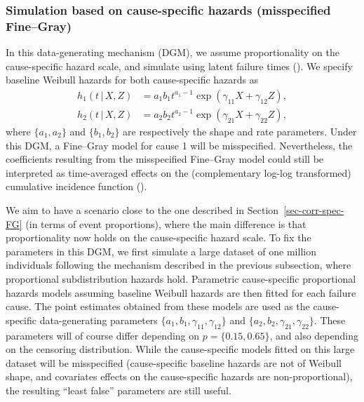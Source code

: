 \documentclass[
  letterpaper,
  paper=240mm:170mm,
  twoside=true,
  open=right,
  fontsize=10pt,
  pagesize=false,
  BCOR=15mm,
  DIV=14,
  headinclude=true,
  footinclude=false,
  headsepline=on]{scrbook}
\newcommand{\given}{\,|\,}
\begin{document}
\subsubsection{Simulation based on cause-specific hazards (misspecified
Fine--Gray)}\label{simulation-based-on-cause-specific-hazards-misspecified-finegray}

In this data-generating mechanism (DGM), we assume proportionality on
the cause-specific hazard scale, and simulate using latent failure times
(). We specify baseline Weibull hazards for both
cause-specific hazards as \begin{align*}
    h_1(t \given X, Z) &= a_1b_1t^{a_1 - 1}\exp(\gamma_{11}X + \gamma_{12}Z), \\
    h_2(t \given X, Z) &= a_2b_2t^{a_2 - 1}\exp(\gamma_{21}X + \gamma_{22}Z),
\end{align*} where \(\{a_1,a_2\}\) and \(\{b_1,b_2\}\) are respectively
the shape and rate parameters. Under this DGM, a Fine--Gray model for
cause 1 will be misspecified. Nevertheless, the coefficients resulting
from the misspecified Fine--Gray model could still be interpreted as
time-averaged effects on the (complementary log-log transformed)
cumulative incidence function
().

We aim to have a scenario close to the one described in
Section~\ref{sec-corr-spec-FG} (in terms of event proportions), where
the main difference is that proportionality now holds on the
cause-specific hazard scale. To fix the parameters in this DGM, we first
simulate a large dataset of one million individuals following the
mechanism described in the previous subsection, where proportional
subdistribution hazards hold. Parametric cause-specific proportional
hazards models assuming baseline Weibull hazards are then fitted for
each failure cause. The point estimates obtained from these models are
used as the cause-specific data-generating parameters
\(\{a_1,b_1, \gamma_{11}, \gamma_{12}\}\) and
\(\{a_2,b_2, \gamma_{21}, \gamma_{22}\}\). These parameters will of
course differ depending on \(p = \{0.15, 0.65\}\), and also depending on
the censoring distribution. While the cause-specific models fitted on
this large dataset will be misspecified (cause-specific baseline hazards
are not of Weibull shape, and covariates effects on the cause-specific
hazards are non-proportional), the resulting ``least false'' parameters
are still useful.
\end{document}
